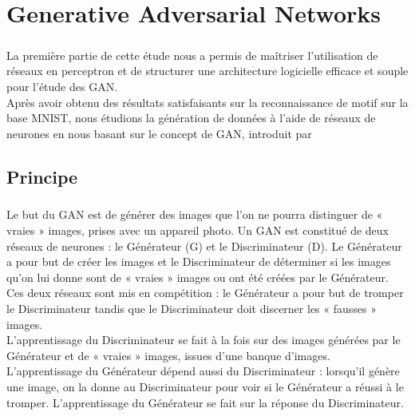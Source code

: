 


\chapter{Generative Adversarial Networks}

\paragraph{}
La première partie de cette étude nous a permis de maîtriser l'utilisation de réseaux en perceptron et de structurer une architecture logicielle efficace et souple pour l'étude des GAN. \\
Après avoir obtenu des résultats satisfaisants sur la reconnaissance de motif sur la base MNIST, nous étudions la génération de données à l'aide de réseaux de neurones en nous basant sur le concept de GAN, introduit par \cite{}

\section{Principe}
\paragraph{}
Le but du GAN est de générer des images que l’on ne pourra distinguer de « vraies » images, prises avec un appareil photo. Un GAN est constitué de deux réseaux de neurones : le Générateur (G) et le Discriminateur (D). Le Générateur a pour but de créer les images et le Discriminateur de déterminer si les images qu’on lui donne sont de « vraies » images ou ont été créées par le Générateur. Ces deux réseaux sont mis en compétition : le Générateur a pour but de tromper le Discriminateur tandis que le Discriminateur doit discerner les « fausses » images.\\
L’apprentissage du Discriminateur se fait à la fois sur des images générées par le Générateur et de « vraies » images, issues d’une banque d’images.\\
L’apprentissage du Générateur dépend aussi du Discriminateur : lorsqu’il génère une image, on la donne au Discriminateur pour voir si le Générateur a réussi à le tromper. L’apprentissage du Générateur se fait sur la réponse du Discriminateur.

